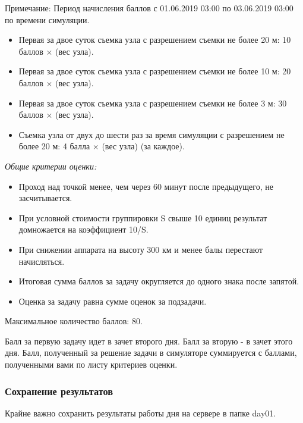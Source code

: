 Примечание: Период начисления баллов с 01.06.2019 03:00 по 03.06.2019 03:00 по времени симуляции.

\markSection

\begin{itemize}
    \item Первая за двое суток съемка узла с разрешением съемки не более 20 м: 10 баллов $\times$ (вес узла).
    \item Первая за двое суток съемка узла с разрешением съемки не более 10 м: 20 баллов $\times$ (вес узла).
    \item Первая за двое суток съемка узла с разрешением съемки не более 3 м: 30 баллов $\times$ (вес узла).
    \item Съемка узла от двух до шести раз за время симуляции с разрешением не более 20 м: 4 балла $\times$ (вес узла) (за каждое).
\end{itemize}

\textit{Общие критерии оценки:}

\begin{itemize}
    \item Проход над точкой менее, чем через 60 минут после предыдущего, не засчитывается.
    \item При условной стоимости группировки S свыше 10 единиц результат домножается на коэффициент 10/S.
    \item При снижении аппарата на высоту 300 км и менее балы перестают начисляться.
    \item Итоговая сумма баллов за задачу округляется до одного знака после запятой.
    \item Оценка за задачу равна сумме оценок за подзадачи.
\end{itemize}

Максимальное количество баллов: 80.

Балл за первую задачу идет в зачет второго дня. Балл за вторую - в зачет этого дня. Балл, полученный за решение задачи в симуляторе суммируется с баллами, полученными вами по листу критериев оценки.

\subsubsection*{Сохранение результатов}

Крайне важно сохранить результаты работы дня на сервере в папке day01.

